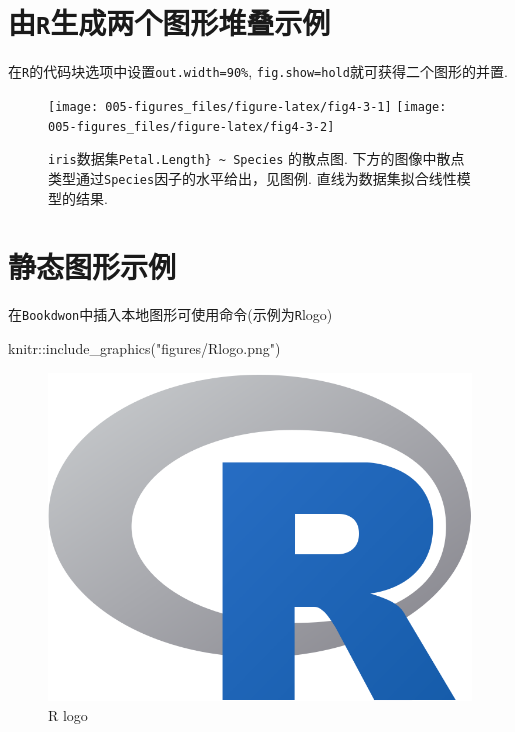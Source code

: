 \documentclass[12pt,]{krantz}
\newenvironment{Shaded}{\begin{snugshade}}{\end{snugshade}}
\newcommand{\FunctionTok}[1]{\textcolor[rgb]{0.00,0.00,0.00}{#1}}
\newcommand{\NormalTok}[1]{#1}
\newcommand{\SpecialCharTok}[1]{\textcolor[rgb]{0.00,0.00,0.00}{#1}}
\newcommand{\StringTok}[1]{\textcolor[rgb]{0.31,0.60,0.02}{#1}}
\theoremstyle{plain}
\theoremstyle{nonumberplain}
\begin{document}
\hypertarget{sec5-3}{%
\section{\texorpdfstring{由\texttt{R}生成两个图形堆叠示例}{由R生成两个图形堆叠示例}}\label{sec5-3}}

\indent

在\texttt{R}的代码块选项中设置\texttt{out.width=\textquotesingle{}90\%\textquotesingle{}}, \texttt{fig.show=\textquotesingle{}hold\textquotesingle{}}就可获得二个图形的并置.



\begin{figure}
\texttt{[image: 005-figures\_files/figure-latex/fig4-3-1]} \texttt{[image: 005-figures\_files/figure-latex/fig4-3-2]} \caption{\texttt{iris}数据集\texttt{Petal.Length\}\ \textasciitilde{}\ Species} 的散点图. 下方的图像中散点类型通过\texttt{Species}因子的水平给出，见图例. 直线为数据集拟合线性模型的结果.}\label{fig:fig4-3}
\end{figure}

\hypertarget{sec5-4}{%
\section{静态图形示例}\label{sec5-4}}

\indent

在\texttt{Bookdwon}中插入本地图形可使用命令(示例为\texttt{R}logo)

\begin{Shaded}
\begin{Highlighting}[]
\NormalTok{knitr}\SpecialCharTok{::}\FunctionTok{include\_graphics}\NormalTok{(}\StringTok{"figures/Rlogo.png"}\NormalTok{)}
\end{Highlighting}
\end{Shaded}



\begin{figure}

{\centering \includegraphics[width=0.7\linewidth]{figures/Rlogo} 

}

\caption{R logo}\label{fig:fig4-4}
\end{figure}
\end{document}
